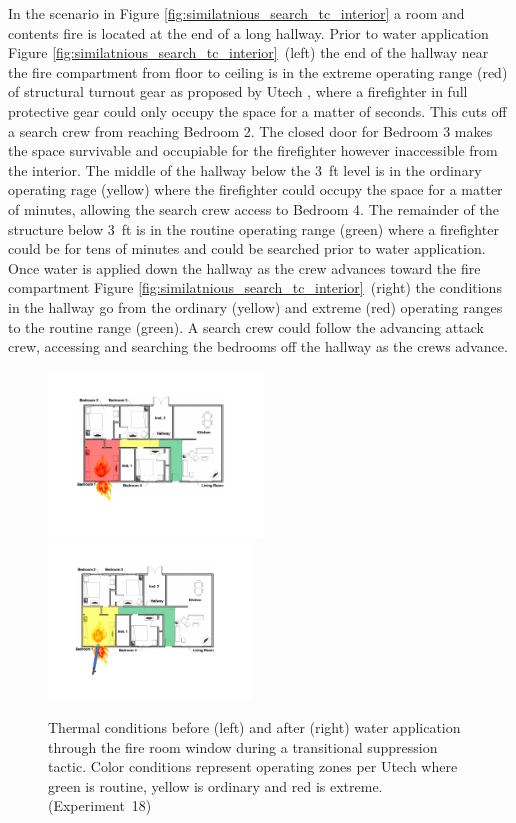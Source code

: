 \documentclass[12pt,oneside]{book}
\begin{document}
In the scenario in Figure \ref{fig:similatnious_search_tc_interior} a room and contents fire is located at the end of a long hallway. Prior to water application Figure \ref{fig:similatnious_search_tc_interior}~(left) the end of the hallway near the fire compartment from floor to ceiling is in the extreme operating range (red) of structural turnout gear as proposed by Utech \cite{Utech_Firefighter_Clothing}, where a firefighter in full protective gear could only occupy the space for a matter of seconds. This cuts off a search crew from reaching Bedroom 2. The closed door for Bedroom 3 makes the space survivable and occupiable for the firefighter however inaccessible from the interior. The middle of the hallway below the 3~ft level is in the ordinary operating rage (yellow) where the firefighter could occupy the space for a matter of minutes, allowing the search crew access to Bedroom 4. The remainder of the structure below 3~ft is in the routine operating range (green) where a firefighter could be for tens of minutes and could be searched prior to water application. Once water is applied down the hallway as the crew advances toward the fire compartment Figure \ref{fig:similatnious_search_tc_interior}~(right) the conditions in the hallway go from the ordinary (yellow) and extreme (red)  operating ranges to the routine range (green). A search crew could follow the advancing attack crew, accessing and searching the bedrooms off the hallway as the crews advance. 

\begin{figure}[H]
\centering
\includegraphics[width=0.51\textwidth]{../0_Images/Tactical_Considerations/Similtanious_Search/Transitional_Pre}
\includegraphics[width=0.48\textwidth]{../0_Images/Tactical_Considerations/Similtanious_Search/Transitional_Post}
\caption[Thermal Conditions - Simultaneous Search - Transitional]{Thermal conditions before (left) and after (right) water application through the fire room window during a transitional suppression tactic. Color conditions represent operating zones per Utech \cite{Utech_Firefighter_Clothing} where green is routine, yellow is ordinary and red is extreme. (Experiment~18)}
\label{fig:similatnious_search_tc_trans}
\end{figure}
\end{document}
